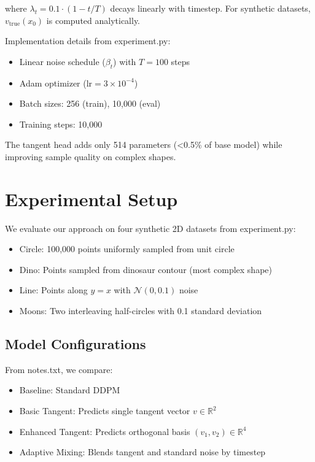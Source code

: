 \documentclass[final]{iclr2024_conference}
\begin{document}
where $\lambda_t = 0.1 \cdot (1 - t/T)$ decays linearly with timestep. For synthetic datasets, $v_{\text{true}}(x_0)$ is computed analytically.

Implementation details from experiment.py:
\begin{itemize}
    \item Linear noise schedule ($\beta_t$) with $T=100$ steps
    \item Adam optimizer ($\text{lr}=3\times10^{-4}$)
    \item Batch sizes: 256 (train), 10,000 (eval)
    \item Training steps: 10,000
\end{itemize}

The tangent head adds only 514 parameters (<0.5\% of base model) while improving sample quality on complex shapes.

\section{Experimental Setup}
\label{sec:experimental}

We evaluate our approach on four synthetic 2D datasets from experiment.py:
\begin{itemize}
    \item Circle: 100,000 points uniformly sampled from unit circle
    \item Dino: Points sampled from dinosaur contour (most complex shape)
    \item Line: Points along $y=x$ with $\mathcal{N}(0,0.1)$ noise
    \item Moons: Two interleaving half-circles with 0.1 standard deviation
\end{itemize}

\subsection{Model Configurations}
From notes.txt, we compare:
\begin{itemize}
    \item Baseline: Standard DDPM \citep{ddpm}
    \item Basic Tangent: Predicts single tangent vector $v\in\mathbb{R}^2$
    \item Enhanced Tangent: Predicts orthogonal basis $(v_1,v_2)\in\mathbb{R}^4$
    \item Adaptive Mixing: Blends tangent and standard noise by timestep
\end{itemize}
\end{document}
